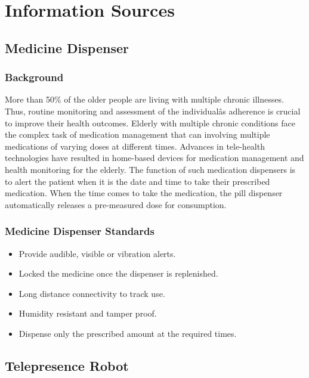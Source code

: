 \documentclass[12pt]{article}
\begin{document}
\section{Information Sources}
\subsection{Medicine Dispenser}
\subsubsection{Background}
More than 50\% of the older people are living with multiple chronic illnesses\cite{2}. Thus, routine monitoring and assessment of the individualâs adherence is crucial to improve their health outcomes. Elderly with multiple chronic conditions face the complex task of medication management that can involving multiple medications of varying doses at different times. Advances in tele-health technologies have resulted in home-based devices for medication management and health monitoring for the elderly\cite{3}. The function of such medication dispensers is to alert the patient when it is the date and time to take their prescribed medication\cite{4}. When the time comes to take the medication, the pill dispenser automatically releases a pre-measured dose for consumption.
\subsubsection{Medicine Dispenser Standards\cite{5}}
\begin{itemize}
    \item Provide audible, visible or vibration alerts.
    \item Locked the medicine once the dispenser is replenished.
    \item Long distance connectivity to track use.
    \item Humidity resistant and tamper proof.
    \item Dispense only the prescribed amount at the required times.
\end{itemize}
\subsection{Telepresence Robot}
\end{document}
